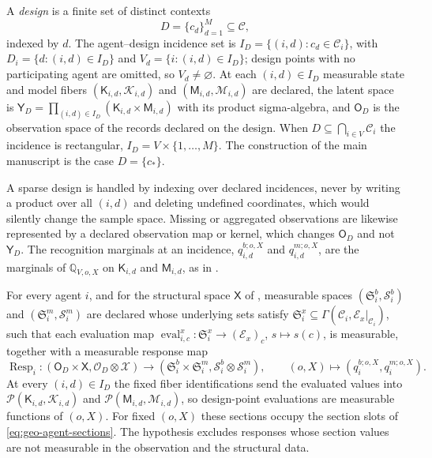 A \emph{design} is a finite set of distinct contexts
\begin{equation}
D=\{c_d\}_{d=1}^{M}\subseteq\mathcal C,
\label{eq:prob-design}
\end{equation}
indexed by \(d\). The agent--design incidence set is \(I_D=\{(i,d):c_d\in\mathcal C_i\}\), with
\(D_i=\{d:(i,d)\in I_D\}\) and \(V_d=\{i:(i,d)\in I_D\}\); design points with no participating agent
are omitted, so \(V_d\neq\varnothing\). At each \((i,d)\in I_D\) measurable state and model fibers
\((\mathsf K_{i,d},\mathscr K_{i,d})\) and \((\mathsf M_{i,d},\mathscr M_{i,d})\) are declared, the
latent space is
\(\mathsf Y_D=\prod_{(i,d)\in I_D}(\mathsf K_{i,d}\times\mathsf M_{i,d})\) with its product
sigma-algebra, and \(\mathsf O_D\) is the observation space of the records declared on the design.
When \(D\subseteq\bigcap_{i\in V}\mathcal C_i\) the incidence is rectangular,
\(I_D=V\times\{1,\ldots,M\}\). The construction of the main manuscript is the case \(D=\{c_*\}\).

A sparse design is handled by indexing over declared incidences, never by writing a product over all
\((i,d)\) and deleting undefined coordinates, which would silently change the sample space. Missing
or aggregated observations are likewise represented by a declared observation map or kernel, which
changes \(\mathsf O_D\) and not \(\mathsf Y_D\). The recognition marginals at an incidence,
\(q_{i,d}^{b;o,X}\) and \(q_{i,d}^{m;o,X}\), are the marginals of \(\mathbb Q_{V,o,X}\) on
\(\mathsf K_{i,d}\) and \(\mathsf M_{i,d}\), as in .

For every agent \(i\), and for the structural space \(\mathsf X\) of
, measurable spaces \((\mathfrak S_i^b,\mathscr S_i^b)\)
and \((\mathfrak S_i^m,\mathscr S_i^m)\) are declared whose underlying sets satisfy
\(\mathfrak S_i^x\subseteq\Gamma(\mathcal C_i,\mathcal E_x|_{\mathcal C_i})\), such that each
evaluation map \(\operatorname{eval}_{i,c}^x:\mathfrak S_i^x\to(\mathcal E_x)_c\), \(s\mapsto s(c)\),
is measurable, together with a measurable response map
\begin{equation}
\operatorname{Resp}_i:
(\mathsf O_D\times\mathsf X,\mathscr O_D\otimes\mathscr X)
\longrightarrow
(\mathfrak S_i^b\times\mathfrak S_i^m,
 \mathscr S_i^b\otimes\mathscr S_i^m),
\qquad
(o,X)\longmapsto(q_i^{b;o,X},q_i^{m;o,X}).
\label{eq:prob-context-section-response}
\end{equation}
At every \((i,d)\in I_D\) the fixed fiber identifications send the evaluated values into
\(\mathcal P(\mathsf K_{i,d},\mathscr K_{i,d})\) and \(\mathcal P(\mathsf M_{i,d},\mathscr M_{i,d})\),
so design-point evaluations are measurable functions of \((o,X)\). For fixed \((o,X)\) these sections
occupy the section slots of \eqref{eq:geo-agent-sections}. The hypothesis excludes responses whose
section values are not measurable in the observation and the structural data.

